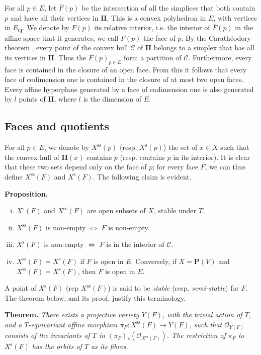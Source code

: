 \documentclass{article}
\newenvironment{itenv}[1]
  {\phantomsection\par\medskip\noindent\textbf{#1.}\itshape}
  {\medskip}
\newcommand{\scr}[1]{{\mathscr{#1}}}
\newcommand{\PP}{\mathbf{P}}
\newcommand{\QQ}{\mathbf{Q}}
\newcommand{\s}{\mathrm{s}}
\renewcommand{\ss}{\mathrm{ss}}
\newcommand{\II}{\mathbf{II}}
\newcommand{\oldpage}[1]{\marginpar{\footnotesize$\Big\vert$ \textit{p.~#1}}}
\begin{document}
For all $p\in E$, let $\overline{F}(p)$ be the intersection of all the simplices that both contain $p$ and have all their vertices in $\II$.
This is a convex polyhedron in $E$, with vertices in $E_\QQ$.
We denote by $F(p)$ its relative interior, i.e. the interior of $\overline{F}(p)$ in the affine space that it generates;
we call $F(p)$ the face of $p$.
By the Carath\'{e}odory theorem \cite[Theorem~1.21]{Val}, every point of the convex hull $\mathcal{C}$ of $\II$ belongs to a simplex that has all its vertices in $\II$.
Thus the $F(p)_{p\in E}$ form a partition of $\mathcal{C}$.
Furthermore, every face is contained in the closure of an open face.
From this it follows that every face of codimension one is contained in the closure of at most two open faces.
Every affine hyperplane generated by a face of codimension one is also generated by $l$ points of $\II$, where $l$ is the dimension of $E$.


\subsection{Faces and quotients}
\label{1.2}

For all $p\in E$, we denote by $X^\ss(p)$ (resp. $X^\s(p)$) the set of $x\in X$ such that the convex hull of $\II(x)$ contains $p$ (resp. contains $p$ in its interior).
It is clear that these two sets depend only on the face of $p$;
for every face $F$, we can thus define $X^\ss(F)$ and $X^\s(F)$.
The following claim is evident.

\begin{itenv}{Proposition}
  \begin{enumerate}[(i)]
    \item $X^\s(F)$ and $X^\ss(F)$ are open subsets of $X$, stable under $T$.
    \item $X^\ss(F)$ is non-empty $\iff$ $F$ is non-empty.
    \item $X^\s(F)$ is non-empty $\iff$ $F$ is in the interior of $\mathcal{C}$.
    \item $X^\ss(F)=X^\s(F)$ if $F$ is open in $E$.
      Conversely, if $X=\PP(V)$ and $X^\ss(F)=X^\s(F)$, then $F$ is open in $E$.
  \end{enumerate}
\end{itenv}

A point of $X^\s(F)$ (rep $X^\ss(F)$) is said to be \emph{stable} (resp. \emph{semi-stable}) for $F$.
The theorem below, and its proof, justify this terminology.

\begin{itenv}{Theorem}
\label{1.2-theorem}
  There exists a projective variety $Y(F)$, with the trivial action
\oldpage{513}
  of $T$, and a $T$-equivariant affine morphism $\pi_F\colon X^\ss(F)\to Y(F)$, such that $\scr{O}_{Y(F)}$ consists of the invariants of $T$ in $(\pi_F)_*(\scr{O}_{X^\ss(F)})$.
  The restriction of $\pi_F$ to $X^\s(F)$ has the orbits of $T$ as its fibres.
\end{itenv}
\end{document}

